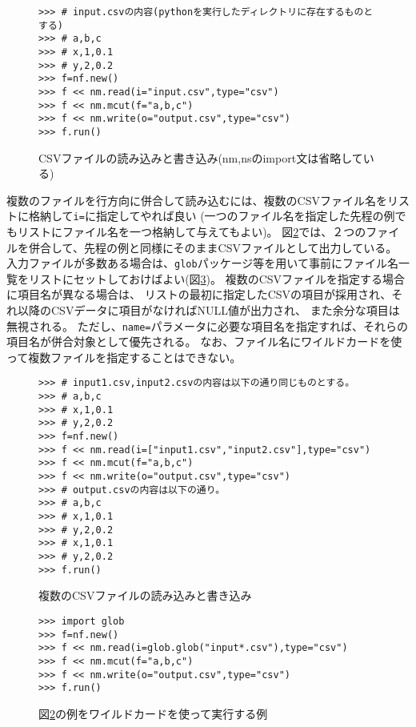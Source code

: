\begin{figure}[htbp]
\begin{Verbatim}[baselinestretch=0.7,frame=single]
>>> # input.csvの内容(pythonを実行したディレクトリに存在するものとする)
>>> # a,b,c
>>> # x,1,0.1
>>> # y,2,0.2
>>> f=nf.new()
>>> f << nm.read(i="input.csv",type="csv")
>>> f << nm.mcut(f="a,b,c")
>>> f << nm.write(o="output.csv",type="csv")
>>> f.run()
\end{Verbatim}
\caption{CSVファイルの読み込みと書き込み(nm,nsのimport文は省略している)\label{code:io_csv1}}
\end{figure}

複数のファイルを行方向に併合して読み込むには、複数のCSVファイル名をリストに格納して\verb|i=|に指定してやれば良い
(一つのファイル名を指定した先程の例でもリストにファイル名を一つ格納して与えてもよい)。
図\ref{code:io_csv2}では、２つのファイルを併合して、先程の例と同様にそのままCSVファイルとして出力している。
入力ファイルが多数ある場合は、\verb|glob|パッケージ等を用いて事前にファイル名一覧をリストにセットしておけばよい(図\ref{code:io_csv3})。
複数のCSVファイルを指定する場合に項目名が異なる場合は、
リストの最初に指定したCSVの項目が採用され、それ以降のCSVデータに項目がなければNULL値が出力され、
また余分な項目は無視される。
ただし、\verb|name=|パラメータに必要な項目名を指定すれば、それらの項目名が併合対象として優先される。
なお、ファイル名にワイルドカードを使って複数ファイルを指定することはできない。

\begin{figure}[htbp]
\begin{Verbatim}[baselinestretch=0.7,frame=single]
>>> # input1.csv,input2.csvの内容は以下の通り同じものとする。
>>> # a,b,c
>>> # x,1,0.1
>>> # y,2,0.2
>>> f=nf.new()
>>> f << nm.read(i=["input1.csv","input2.csv"],type="csv")
>>> f << nm.mcut(f="a,b,c")
>>> f << nm.write(o="output.csv",type="csv")
>>> # output.csvの内容は以下の通り。
>>> # a,b,c
>>> # x,1,0.1
>>> # y,2,0.2
>>> # x,1,0.1
>>> # y,2,0.2
>>> f.run()
\end{Verbatim}
\caption{複数のCSVファイルの読み込みと書き込み\label{code:io_csv2}}
\end{figure}

\begin{figure}[htbp]
\begin{Verbatim}[baselinestretch=0.7,frame=single]
>>> import glob
>>> f=nf.new()
>>> f << nm.read(i=glob.glob("input*.csv"),type="csv")
>>> f << nm.mcut(f="a,b,c")
>>> f << nm.write(o="output.csv",type="csv")
>>> f.run()
\end{Verbatim}
\caption{図\ref{code:io_csv2}の例をワイルドカードを使って実行する例\label{code:io_csv3}}
\end{figure}


